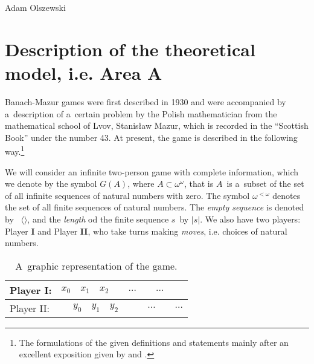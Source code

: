 \begin{artengenv}{Adam Olszewski}
\section{Description of the theoretical model, i.e. Area A}
Banach-Mazur games were first described in 1930 and were accompanied by a~description of a~certain problem by the Polish mathematician from the mathematical school of Lvov, Stanisław Mazur, which is recorded in the ``Scottish Book'' under the number 43. At present, the game is described in the following way.\footnote{The formulations of the given definitions and statements mainly after an excellent exposition given by
\parencite[][]{khomskii_infinite_2010} %
 and 
\parencite[][]{soare_turing_2016}.%
}

We will consider an infinite two-person game with complete information, which we denote by the symbol $G(A)$, where $A\subset\omega^{\omega}$, that is $A$~is a~subset of the set of all infinite sequences of natural numbers with zero. The symbol $\omega^{<\omega}$ denotes the set of all finite sequences of natural numbers. The \textit{empty sequence} is denoted by~%
${\langle}{\rangle}$, and the \textit{length} od the finite sequence $s$~by $|s|$. We also have two players: Player \textbf{I} and Player \textbf{II}, who take turns making \textit{moves}, i.e. choices of natural numbers.





\begin{table}[H]
\begin{small}

\begin{tabular}{|p{}|p{}|}
\hline
Player I: &
$x_{0} \quad x_{1} \quad x_{2} \qquad \ldots \qquad \ldots$\\\hline
Player II: &
$\ \quad y_{0} \quad y_{1} \quad y_{2} \qquad \quad\ldots \qquad \ldots$\\\hline
\end{tabular}
\end{small}
\caption{A~graphic representation of the game.}

\end{table}


\end{artengenv}
